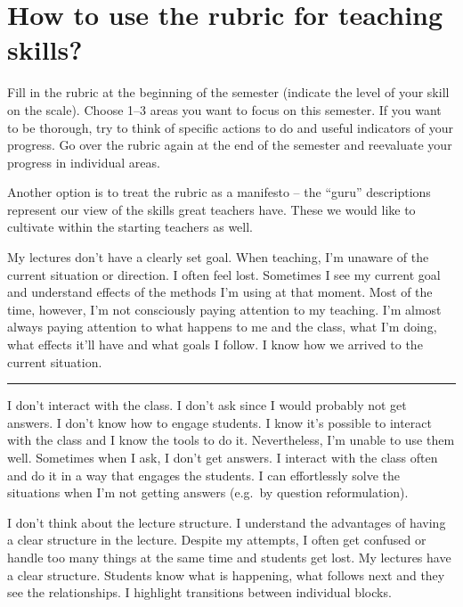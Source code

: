\section*{How to use the rubric for teaching skills?}

Fill in the rubric at the beginning of the semester (indicate the level of your skill on the scale). Choose 1--3 areas you want to focus on this semester. If you want to be thorough, try to think of specific actions to do and useful indicators of your progress. Go over the rubric again at the end of the semester and reevaluate your progress in individual areas.

Another option is to treat the rubric as a manifesto -- the \enquote{guru} descriptions represent our view of the skills great teachers have. These we would like to cultivate within the starting teachers as well.


\newpage
{}
{My lectures don't have a clearly set goal. When teaching, I'm unaware of the current situation or direction. I often feel lost.}
{Sometimes I see my current goal and understand effects of the methods I'm using at that moment. Most of the time, however, I'm not consciously paying attention to my teaching.}
{I'm almost always paying attention to what happens to me and the class, what I'm doing, what effects it'll have and what goals I follow. I know how we arrived to the current situation.}

\rule{\textwidth}{0.4pt}
{I don't interact with the class. I don't ask since I would probably not get answers. I don't know how to engage students.}
{I know it's possible to interact with the class and I know the tools to do it. Nevertheless, I'm unable to use them well. Sometimes when I ask, I don't get answers.}
{I interact with the class often and do it in a way that engages the students. I can effortlessly solve the situations when I'm not getting answers (e.g.\ by question reformulation).}

\newpage
{}
{I don't think about the lecture structure.}
{I understand the advantages of having a clear structure in the lecture. Despite my attempts, I often get confused or handle too many things at the same time and students get lost.}
{My lectures have a clear structure. Students know what is happening, what follows next and they see the relationships. I highlight transitions between individual blocks.}

